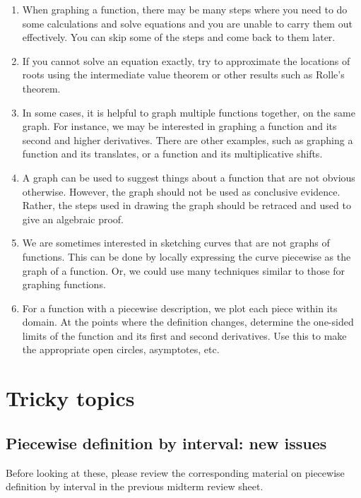 \documentclass[10pt]{amsart}
\begin{document}
\begin{enumerate}
\item When graphing a function, there may be many steps where you need
  to do some calculations and solve equations and you are unable to
  carry them out effectively. You can skip some of the steps and come
  back to them later.
\item If you cannot solve an equation exactly, try to approximate the
  locations of roots using the intermediate value theorem or other
  results such as Rolle's theorem.
\item In some cases, it is helpful to graph multiple functions
  together, on the same graph. For instance, we may be interested in
  graphing a function and its second and higher derivatives. There are
  other examples, such as graphing a function and its translates, or a
  function and its multiplicative shifts.
\item A graph can be used to suggest things about a function that are
  not obvious otherwise. However, the graph should not be used as
  conclusive evidence. Rather, the steps used in drawing the graph
  should be retraced and used to give an algebraic proof.
\item We are sometimes interested in sketching curves that are not
  graphs of functions. This can be done by locally expressing the
  curve piecewise as the graph of a function. Or, we could use many
  techniques similar to those for graphing functions.
\item For a function with a piecewise description, we plot each piece
  within its domain. At the points where the definition changes,
  determine the one-sided limits of the function and its first and
  second derivatives. Use this to make the appropriate open circles,
  asymptotes, etc.
\end{enumerate}

\section{Tricky topics}

\subsection{Piecewise definition by interval: new issues}

Before looking at these, please review the corresponding material on
piecewise definition by interval in the previous midterm review sheet.
\end{document}
